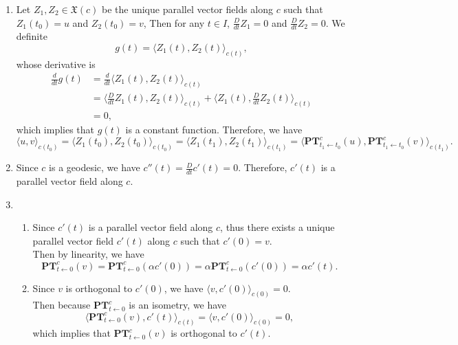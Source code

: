 \documentclass[en, oneside]{assignment}
\begin{document}
\begin{sol}
    \begin{enumerate}[label=(\arabic*)]
        \item Let $Z_1, Z_2 \in \mathfrak{X} (c)$ be the unique parallel vector fields along $c$ such that $Z_1(t_0) = u$ and $Z_2(t_0) = v$,
        Then for any $t \in I$, $\frac{D}{dt} Z_1 = 0$ and $\frac{D}{dt} Z_2 = 0$. We definite
        \begin{equation*}
            g(t) = \langle Z_1(t), Z_2(t) \rangle _{c(t)},
        \end{equation*}
        whose derivative is
        \begin{align*}
            \frac{d}{dt} g(t) &= \frac{d}{dt} \langle Z_1(t), Z_2(t) \rangle _{c(t)}\\
            &= \langle \frac{D}{dt} Z_1(t), Z_2(t) \rangle _{c(t)} + \langle Z_1(t), \frac{D}{dt} Z_2(t) \rangle _{c(t)}\\
            &= 0,
        \end{align*}
        which implies that $g(t)$ is a constant function. Therefore, we have
        \begin{equation*}
            \langle u, v \rangle _{c(t_0)} = \langle Z_1(t_0), Z_2(t_0) \rangle _{c(t_0)} = \langle Z_1(t_1), Z_2(t_1) \rangle _{c(t_1)} 
            = \langle \mathbf{P} \mathbf{T}^c_{t_1 \leftarrow t_0} (u), \mathbf{P} \mathbf{T}^c_{t_1 \leftarrow t_0} (v) \rangle _{c(t_1)}.
        \end{equation*}
        \item Since $c$ is a geodesic, we have $c''(t) = \frac{D}{dt} c'(t) = 0$. Therefore, $c'(t)$ is a parallel vector field along $c$.
        \item 
        \begin{enumerate}[label=(\alph*)]
            \item Since $c'(t)$ is a parallel vector field along $c$, thus there exists a unique parallel vector field $c'(t)$ along $c$ such that $c'(0) = v$.\\
            Then by linearity, we have
            \begin{equation*}
                \mathbf{P} \mathbf{T}^c_{t \leftarrow 0} (v) = \mathbf{P} \mathbf{T}^c_{t \leftarrow 0} (\alpha c'(0)) = \alpha \mathbf{P} \mathbf{T}^c_{t \leftarrow 0} (c'(0)) = \alpha c'(t).
            \end{equation*}
            \item Since $v$ is orthogonal to $c'(0)$, we have $\langle v, c'(0) \rangle _{c(0)} = 0$.\\
            Then because $\mathbf{P} \mathbf{T}^c_{t \leftarrow 0}$ is an isometry, we have
            \begin{equation*}
                \langle \mathbf{P} \mathbf{T}^c_{t \leftarrow 0} (v), c'(t) \rangle _{c(t)} = \langle v, c'(0) \rangle _{c(0)} = 0,
            \end{equation*}
            which implies that $\mathbf{P} \mathbf{T}^c_{t \leftarrow 0} (v)$ is orthogonal to $c'(t)$.
        \end{enumerate}
    \end{enumerate}
\end{sol}
\end{document}
